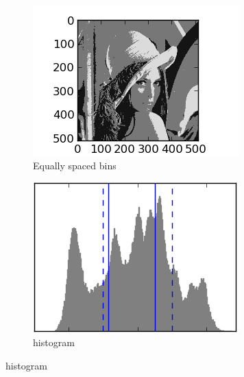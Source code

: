 \documentclass{article}
\begin{document}
\begin{figure}
\begin{subfigure}[b]{0.3\textwidth}
                    \label{fig:compressed3}
            \end{subfigure}
            ~ %
            \begin{subfigure}[b]{0.3\textwidth}
                    \centering
                    \includegraphics[width=\textwidth]{equal_bins_3.png}
                    \caption{Equally spaced bins}
                    \label{fig:equal_bins3}
            \end{subfigure}
            \caption{colors groups by kmeans, 3 bins}\label{fig:images3}
            
             \begin{subfigure}[b]{0.3\textwidth}
                    \centering
                    \includegraphics[width=\textwidth]{histogram_3.png}
                    \caption{histogram}
                    \label{fig:histogram3}
            \end{subfigure}
    \end{figure}
\end{document}
